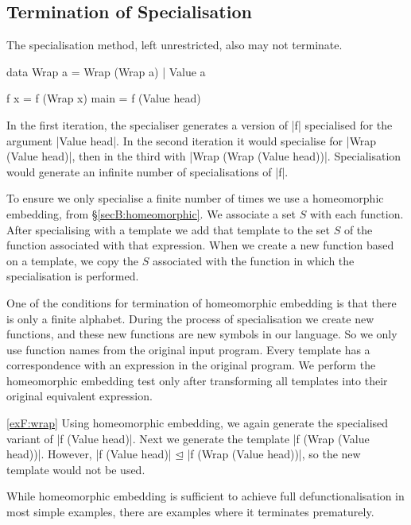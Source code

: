 \subsection{Termination of Specialisation}
\label{secF:termination_specialisation}

The specialisation method, left unrestricted, also may not terminate.

\begin{example}
\label{exF:wrap}
\begin{code}
data Wrap a  =  Wrap (Wrap a)
             |  Value a

f x = f (Wrap x)
main = f (Value head)
\end{code}

In the first iteration, the specialiser generates a version of |f| specialised for the argument |Value head|. In the second iteration it would specialise for |Wrap (Value head)|, then in the third with |Wrap (Wrap (Value head))|. Specialisation would generate an infinite number of specialisations of |f|.
\end{example}

To ensure we only specialise a finite number of times we use a homeomorphic embedding, from \S\ref{secB:homeomorphic}. We associate a set $S$ with each function. After specialising with a template we add that template to the set $S$ of the function associated with that expression. When we create a new function based on a template, we copy the $S$ associated with the function in which the specialisation is performed.

One of the conditions for termination of homeomorphic embedding is that there is only a finite alphabet. During the process of specialisation we create new functions, and these new functions are new symbols in our language. So we only use function names from the original input program. Every template has a correspondence with an expression in the original program. We perform the homeomorphic embedding test only after transforming all templates into their original equivalent expression.

\begin{examplerevisit}{\ref{exF:wrap}}
Using homeomorphic embedding, we again generate the specialised variant of |f (Value head)|. Next we generate the template |f (Wrap (Value head))|. However, |f (Value head)| $\unlhd{}$ |f (Wrap (Value head))|, so the new template would not be used.
\end{examplerevisit}

While homeomorphic embedding is sufficient to achieve full defunctionalisation in most simple examples, there are examples where it terminates prematurely.

